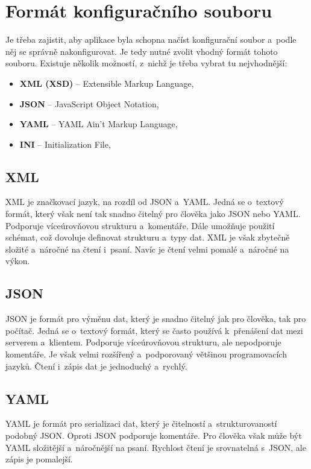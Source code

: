 \section{Formát konfiguračního souboru}
Je třeba zajistit, aby aplikace byla schopna načíst konfigurační soubor a~podle něj se správně nakonfigurovat.
Je tedy nutné zvolit vhodný formát tohoto souboru.
Existuje několik možností, z~nichž je třeba vybrat tu nejvhodnější:

\begin{itemize}
    \item \textbf{XML (XSD)} -- Extensible Markup Language,
    \item \textbf{JSON} -- JavaScript Object Notation,
    \item \textbf{YAML} -- YAML Ain't Markup Language,
    \item \textbf{INI} -- Initialization File,
\end{itemize}

\subsection{XML}
XML je značkovací jazyk, na rozdíl od JSON a~YAML.
Jedná se o~textový formát, který však není tak snadno čitelný pro člověka jako JSON nebo YAML.
Podporuje víceúrovňovou strukturu a~komentáře.
Dále umožňuje použití schémat, což dovoluje definovat strukturu a~typy dat.
XML je však zbytečně složité a~náročné na čtení i~psaní.
Navíc je čtení velmi pomalé a~náročné na výkon.
\cite{cisco_xml_json_yaml}

\subsection{JSON}
JSON je formát pro výměnu dat, který je snadno čitelný jak pro člověka, tak pro počítač.
Jedná se o~textový formát, který se často používá k~přenášení dat mezi serverem a~klientem.
Podporuje víceúrovňovou strukturu, ale nepodporuje komentáře.
Je však velmi rozšířený a~podporovaný většinou programovacích jazyků.
Čtení i~zápis dat je jednoduchý a~rychlý.
\cite{cisco_xml_json_yaml}

\subsection{YAML}
YAML je formát pro serializaci dat, který je čitelností a~strukturovaností podobný JSON.
Oproti JSON podporuje komentáře.
Pro člověka však může být YAML složitější a~náročnější na psaní.
Rychlost čtení je srovnatelná s~JSON, ale zápis je pomalejší.
\cite{cisco_xml_json_yaml}

